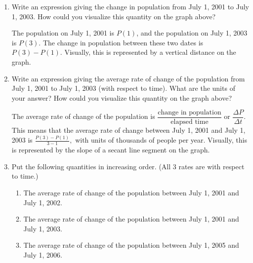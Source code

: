 \documentclass{article}
\begin{document}
\begin{enumerate}
  \begin{enumerate}[resume]
  \item


    \begin{problem}[\vfill]
      Write an expression giving the change in population from July 1, 2001 to July 1, 2003. How could you visualize this quantity on the graph above?
    \end{problem}

    \begin{solution}
      The population on July 1, 2001 is $P(1)$, and the population on July 1, 2003 is $P(3)$. 
      The change in population between these two dates is $\boxed{P(3)-P(1).}$ Visually, this is 
      represented by a vertical distance on the graph.
    \end{solution}

  \item


    \begin{problem}[\vfill\newpage]
      Write an expression giving the average rate of change of the population from July 1, 2001 to July 1, 2003 (with respect to time). What are the units of your answer? How could you visualize this quantity on the graph above?
    \end{problem}

    \begin{solution}
      The average rate of change of the population is 
      $\dfrac{\text{change in population}}{\text{elapsed time}}$ or $\dfrac{\Delta P}{\Delta t}$. 
      This means that the average rate of change between July 1, 2001 and July 1, 2003 is
      $\boxed{\frac{P(3)-P(1)}{3-1},}$ with units of thousands of people per year. Visually, this
      is represented by the slope of a secant line segment on the graph.
    \end{solution}

  \item


    \begin{problem}[\stretch{1.5}]
      Put the following quantities in increasing order. (All 3 rates
      are with respect to time.) 
      \begin{enumerate}[label=\Alph*., itemsep=0pt, parsep=0pt]
      \item The average rate of change of the population between July 1, 2001 and July 1, 2002.
      \item The average rate of change of the population between July 1, 2001 and July 1, 2003.
      \item The average rate of change of the population between July 1, 2005 and July 1, 2006.
      \end{enumerate}
    \end{problem}


\end{enumerate}
\end{enumerate}
\end{document}
